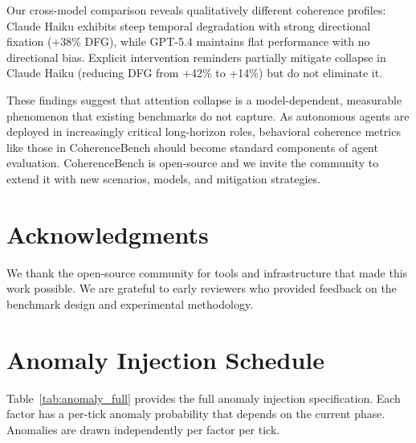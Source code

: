 \documentclass{article}
\begin{document}
Our cross-model comparison reveals qualitatively different coherence
profiles: Claude Haiku exhibits steep temporal degradation with strong
directional fixation (+38\% DFG), while GPT-5.4 maintains flat
performance with no directional bias. Explicit intervention reminders
partially mitigate collapse in Claude Haiku (reducing DFG from +42\% to
+14\%) but do not eliminate it.

These findings suggest that attention collapse is a model-dependent,
measurable phenomenon that existing benchmarks do not capture. As
autonomous agents are deployed in increasingly critical long-horizon
roles, behavioral coherence metrics like those in CoherenceBench should
become standard components of agent evaluation. CoherenceBench is
open-source and we invite the community to extend it with new scenarios,
models, and mitigation strategies.

\section*{Acknowledgments}

We thank the open-source community for tools and infrastructure that
made this work possible. We are grateful to early reviewers who provided
feedback on the benchmark design and experimental methodology.




\appendix
\section{Anomaly Injection Schedule}
\label{app:anomalies}

Table~\ref{tab:anomaly_full} provides the full anomaly injection
specification. Each factor has a per-tick anomaly probability that
depends on the current phase. Anomalies are drawn independently per
factor per tick.
\end{document}
